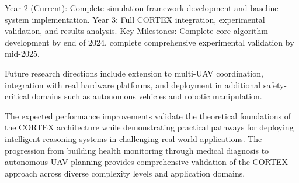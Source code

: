 Year 2 (Current): Complete simulation framework development and baseline system implementation.
Year 3: Full CORTEX integration, experimental validation, and results analysis.
Key Milestones: Complete core algorithm development by end of 2024, complete comprehensive experimental validation by mid-2025.

Future research directions include extension to multi-UAV coordination, integration with real hardware platforms, and deployment in additional safety-critical domains such as autonomous vehicles and robotic manipulation.

The expected performance improvements validate the theoretical foundations of the CORTEX architecture while demonstrating practical pathways for deploying intelligent reasoning systems in challenging real-world applications. The progression from building health monitoring through medical diagnosis to autonomous UAV planning provides comprehensive validation of the CORTEX approach across diverse complexity levels and application domains. 